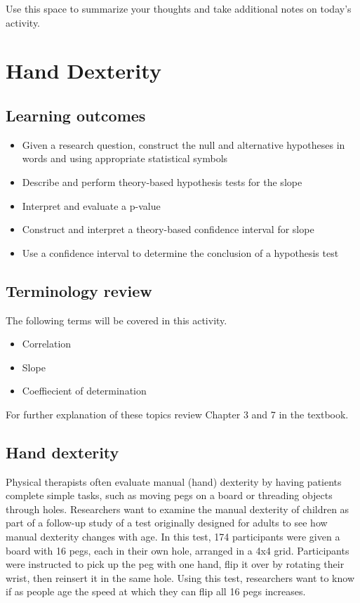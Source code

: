 \documentclass[
]{report}
\begin{document}
Use this space to summarize your thoughts and take additional notes on today's activity.

\hypertarget{hand-dexterity}{%
\chapter{Hand Dexterity}\label{hand-dexterity}}

\hypertarget{learning-outcomes}{%
\section{Learning outcomes}\label{learning-outcomes}}

\begin{itemize}
\item
  Given a research question, construct the null and alternative hypotheses
  in words and using appropriate statistical symbols
\item
  Describe and perform theory-based hypothesis tests for the slope
\item
  Interpret and evaluate a p-value
\item
  Construct and interpret a theory-based confidence interval for slope
\item
  Use a confidence interval to determine the conclusion of a hypothesis test
\end{itemize}

\hypertarget{terminology-review}{%
\section{Terminology review}\label{terminology-review}}

The following terms will be covered in this activity.

\begin{itemize}
\item
  Correlation
\item
  Slope
\item
  Coeffiecient of determination
\end{itemize}

For further explanation of these topics review Chapter 3 and 7 in the textbook.

\hypertarget{hand-dexterity-1}{%
\section{Hand dexterity}\label{hand-dexterity-1}}

Physical therapists often evaluate manual (hand) dexterity by having patients complete simple tasks, such as moving pegs on a board or threading objects through holes. Researchers want to examine the manual dexterity of children as part of a follow-up study of a test originally designed for adults to see how manual dexterity changes with age. In this test, 174 participants were given a board with 16 pegs, each in their own hole, arranged in a 4x4 grid. Participants were instructed to pick up the peg with one hand, flip it over by rotating their wrist, then reinsert it in the same hole. Using this test, researchers want to know if as people age the speed at which they can flip all 16 pegs increases.
\end{document}
